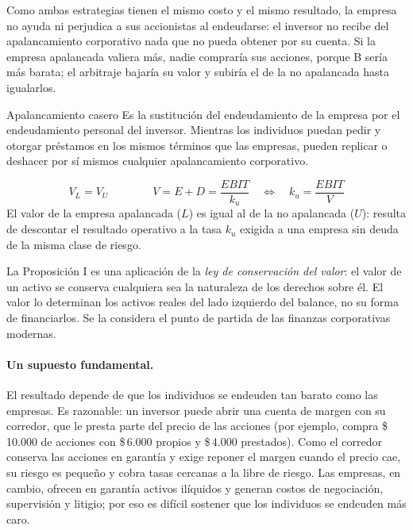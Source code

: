 Como ambas estrategias tienen el mismo costo y el mismo resultado, la empresa no ayuda ni perjudica a sus accionistas al endeudarse: el inversor no recibe del apalancamiento corporativo nada que no pueda obtener por su cuenta. Si la empresa apalancada valiera más, nadie compraría sus acciones, porque B sería más barata; el arbitraje bajaría su valor y subiría el de la no apalancada hasta igualarlos.

\begin{definicion}{Apalancamiento casero}
Es la sustitución del endeudamiento de la empresa por el endeudamiento personal del inversor. Mientras los individuos puedan pedir y otorgar préstamos en los mismos términos que las empresas, pueden replicar o deshacer por sí mismos cualquier apalancamiento corporativo.
\end{definicion}

\begin{formulaBox}
\[
V_L = V_U
\qquad\qquad
V = E + D = \frac{EBIT}{k_u}
\quad\Longleftrightarrow\quad
k_u = \frac{EBIT}{V}
\]
El valor de la empresa apalancada ($L$) es igual al de la no apalancada ($U$): resulta de descontar el resultado operativo a la tasa $k_u$ exigida a una empresa sin deuda de la misma clase de riesgo.
\end{formulaBox}

La Proposición I es una aplicación de la \emph{ley de conservación del valor}: el valor de un activo se conserva cualquiera sea la naturaleza de los derechos sobre él. El valor lo determinan los activos reales del lado izquierdo del balance, no su forma de financiarlos. Se la considera el punto de partida de las finanzas corporativas modernas.

\paragraph{Un supuesto fundamental.} El resultado depende de que los individuos se endeuden tan barato como las empresas. Es razonable: un inversor puede abrir una cuenta de margen con su corredor, que le presta parte del precio de las acciones (por ejemplo, compra \$\,10.000 de acciones con \$\,6.000 propios y \$\,4.000 prestados). Como el corredor conserva las acciones en garantía y exige reponer el margen cuando el precio cae, su riesgo es pequeño y cobra tasas cercanas a la libre de riesgo. Las empresas, en cambio, ofrecen en garantía activos ilíquidos y generan costos de negociación, supervisión y litigio; por eso es difícil sostener que los individuos se endeuden más caro.


